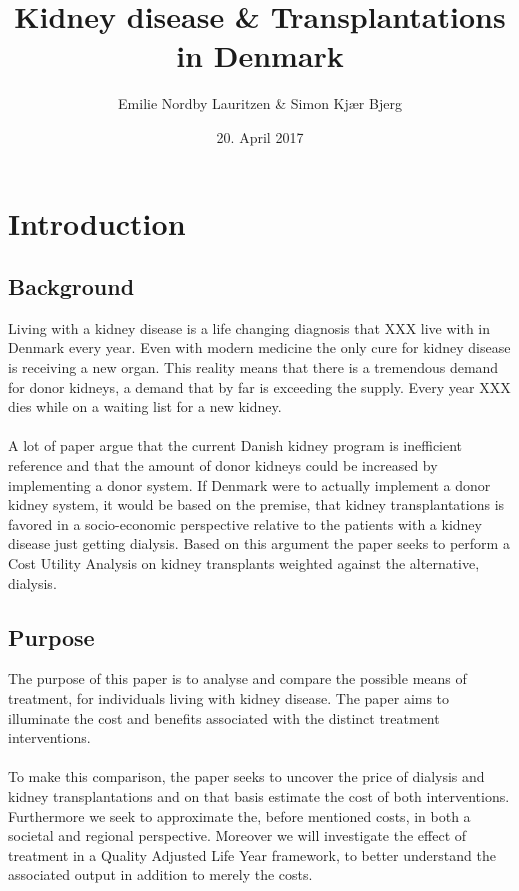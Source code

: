 \documentclass[a4paper,12pt]{article}
\title{Kidney disease \& Transplantations in Denmark}
\author{Emilie Nordby Lauritzen \& Simon Kjær Bjerg}
\date{20. April 2017}
\begin{document}
\maketitle
\newpage

\begin{abstract}
\end{abstract}	
\newpage
\tableofcontents

\newpage
\section{Introduction}

\subsection{Background}

Living with a kidney disease is a life changing diagnosis that XXX live with in Denmark every year. Even with modern medicine the only cure for kidney disease is receiving a new organ. This reality means that there is a tremendous demand for donor kidneys, a demand that by far is exceeding the supply. Every year XXX dies while on a waiting list for a new kidney. 
\\\\
A lot of paper argue that the current Danish kidney program is inefficient reference and that the amount of donor kidneys could be increased by implementing a donor system. If Denmark were to actually implement a donor kidney system, it would be based on the premise, that kidney transplantations is favored in a socio-economic perspective relative to the patients with a kidney disease just getting dialysis. Based on this argument the paper seeks to perform a Cost Utility Analysis on kidney transplants weighted against the alternative, dialysis.

\subsection{Purpose}

The purpose of this paper is to analyse and compare the possible means of treatment, for individuals living with kidney disease. The paper aims to illuminate the cost and benefits associated with the distinct treatment interventions.
\\\\
To make this comparison, the paper seeks to uncover the price of dialysis and kidney transplantations and on that basis estimate the cost of both interventions. Furthermore we seek to approximate the, before mentioned costs, in both a societal and regional perspective. Moreover we will investigate the effect of treatment in a Quality Adjusted Life Year framework, to better understand the associated output in addition to merely the costs.
\end{document}
